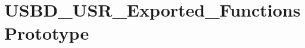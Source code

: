 \hypertarget{group___u_s_b_d___u_s_r___exported___functions_prototype}{\section{U\-S\-B\-D\-\_\-\-U\-S\-R\-\_\-\-Exported\-\_\-\-Functions\-Prototype}
\label{group___u_s_b_d___u_s_r___exported___functions_prototype}
}
